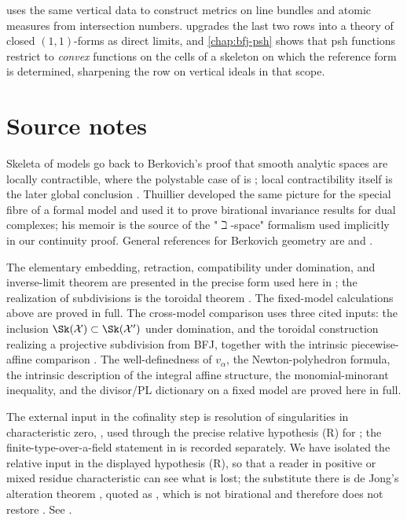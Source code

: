  uses the same vertical data to construct metrics on line bundles
and atomic measures from intersection numbers. 
upgrades the last two rows into a theory of closed $(1,1)$-forms as
direct limits, and \cref{chap:bfj-psh} shows that psh functions restrict to
\emph{convex} functions on the cells of a skeleton on which the reference
form is determined, sharpening the row on vertical ideals in that scope.

\section*{Source notes}

Skeleta of models go back to Berkovich's proof that smooth analytic spaces
are locally contractible, where the polystable case of
 is
\cite[Theorem~8.1]{Berkovich1999LocalContractibility}; local contractibility
itself is the later global conclusion
\cite[Theorem~9.1]{Berkovich1999LocalContractibility}. Thuillier developed
the same picture for the special fibre of a formal model and used it to prove
birational invariance results for dual complexes; his memoir is the source
of the "$\beth$-space" formalism used implicitly in our continuity proof.
General references for Berkovich geometry are \cite{Berk12} and
\cite{Berk93}.

The elementary embedding, retraction, compatibility under domination, and
inverse-limit theorem are presented in the precise form used here in
\cite[Theorem~3.1, Proposition~3.6, and Corollary~3.2]{BFJ16}; the
realization of subdivisions is the toroidal theorem
\cite[Theorem~3.15]{BFJ16}. The fixed-model calculations above are proved
in full.  The cross-model comparison uses three cited inputs: the inclusion
$\Sk(\mathcal X)\subset\Sk(\mathcal X')$ under domination, and the
toroidal construction realizing a projective subdivision from BFJ, together
with the intrinsic piecewise-affine comparison
\cite[Proposition~3.2.3 and Corollary~3.2.4]{MustataNicaise2015}. The
well-definedness of $v_\alpha$, the Newton-polyhedron formula, the
intrinsic description of the integral affine structure, the
monomial-minorant inequality, and the divisor/PL dictionary on a fixed model
are proved here in full.

The external input in the cofinality step is resolution of singularities in
characteristic zero, \cite{Hironaka1964I,Hironaka1964II}, used through
the precise relative hypothesis (R) for ; the
finite-type-over-a-field statement in  is recorded
separately. We have isolated the relative input
in the displayed hypothesis (R), so that a reader in positive or mixed
residue characteristic can see what is lost; the substitute there is de
Jong's alteration theorem \cite{deJong1996}, quoted as
, which is not birational and therefore does not
restore . See
.

